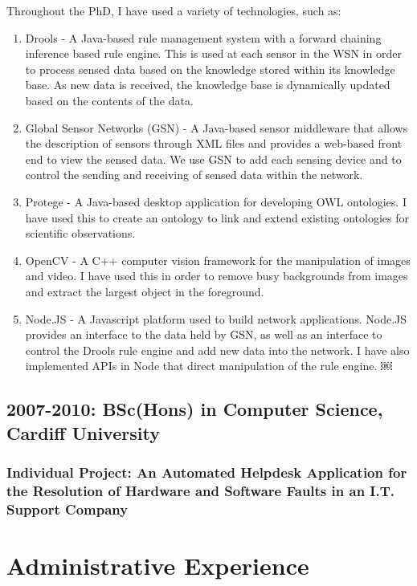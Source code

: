 \documentclass[11pt,fullpage]{article}
\begin{document}
Throughout the PhD, I have used a variety of technologies, such as:
\begin{enumerate}
	\item Drools - A Java-based rule management system with a forward chaining inference based rule engine. This is used at each sensor in the WSN in order to process sensed data based on the knowledge stored within its knowledge base. As new data is received, the knowledge base is dynamically updated based on the contents of the data.
	\item Global Sensor Networks (GSN) - A Java-based sensor middleware that allows the description of sensors through XML files and provides a web-based front end to view the sensed data. We use GSN to add each sensing device and to control the sending and receiving of sensed data within the network.
	\item Protege - A Java-based desktop application for developing OWL ontologies. I have used this to create an ontology to link and extend existing ontologies for scientific observations.
	\item OpenCV - A C++ computer vision framework for the manipulation of images and video. I have used this in order to remove busy backgrounds from images and extract the largest object in the foreground.
	\item Node.JS - A Javascript platform used to build network applications. Node.JS provides an interface to the data held by GSN, as well as an interface to control the Drools rule engine and add new data into the network. I have also implemented APIs in Node that direct manipulation of the rule engine.
￼\end{enumerate}
	
\subsection*{\textbf{2007-2010: BSc(Hons)} in Computer Science, Cardiff University}
\subsubsection*{\textbf{Individual Project:} An Automated Helpdesk Application for the Resolution of Hardware and Software Faults in an I.T. Support Company}

\section*{Administrative Experience}
\end{document}
